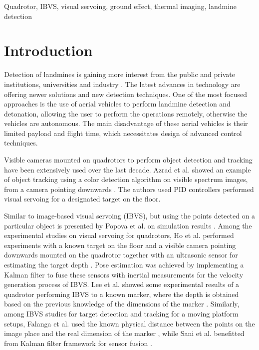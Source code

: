 \documentclass[conference]{IEEEtran}
\begin{document}
\begin{IEEEkeywords}
Quadrotor, IBVS, visual servoing, ground effect, thermal imaging, landmine detection
\end{IEEEkeywords}

\section{Introduction} Detection of landmines is gaining more interest from the public and private institutions, universities and industry \cite{ICBL2018}. The latest advances in technology are offering newer solutions and new detection techniques. One of the most focused approaches is the use of aerial vehicles to perform landmine detection and detonation, allowing the user to perform the operations remotely, otherwise the vehicles are autonomous. The main disadvantage of these aerial vehicles is their limited payload and flight time, which necessitates design of advanced control techniques.

Visible cameras mounted on quadrotors to perform object detection and tracking have been extensively used over the last decade. Azrad et al. showed an example of object tracking using a color detection algorithm on visible spectrum images, from a camera pointing downwards \cite{AZRAD2010}. The authors used PID controllers performed visual servoing for a designated target on the floor. 

Similar to image-based visual servoing (IBVS), but using the points detected on a particular object is presented by Popova et al. on simulation results \cite{Popova}. Among the experimental studies on visual servoing for quadrotors, Ho et al. performed experiments with a known target on the floor and a visible camera pointing downwards mounted on the quadrotor together with an ultrasonic sensor for estimating the target depth \cite{Ho2013}. Pose estimation was achieved by implementing a Kalman filter to fuse these sensors with inertial measurements for the velocity generation process of IBVS. Lee et al. showed some experimental results of a quadrotor performing IBVS to a known marker, where the depth is obtained based on the previous knowledge of the dimensions of the marker \cite{Lee2011}. Similarly, among IBVS studies for target detection and tracking for a moving platform setups, Falanga et al. used the known physical distance between the points on the image place and the real dimension of the marker \cite{Falanga2017}, while Sani et al. benefitted from Kalman filter framework for sensor fusion \cite{Sani2019}.
\end{document}
